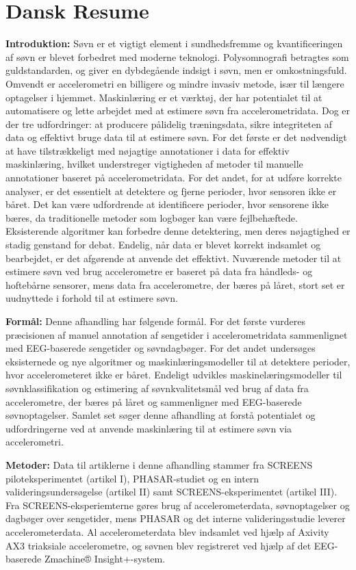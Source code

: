 \documentclass[
  10pt,
]{scrbook}
\begin{document}
\hypertarget{dansk-resume}{%
\chapter{Dansk Resume}\label{dansk-resume}}

\textbf{Introduktion:} Søvn er et vigtigt element i sundhedsfremme og
kvantificeringen af søvn er blevet forbedret med moderne teknologi.
Polysomnografi betragtes som guldstandarden, og giver en dybdegående
indsigt i søvn, men er omkostningsfuld. Omvendt er accelerometri en
billigere og mindre invasiv metode, især til længere optagelser i
hjemmet. Maskinlæring er et værktøj, der har potentialet til at
automatisere og lette arbejdet med at estimere søvn fra
accelerometridata. Dog er der tre udfordringer: at producere pålidelig
træningsdata, sikre integriteten af data og effektivt bruge data til at
estimere søvn. For det første er det nødvendigt at have tilstrækkeligt
med nøjagtige annotationer i data for effektiv maskinlæring, hvilket
understreger vigtigheden af metoder til manuelle annotationer baseret på
accelerometridata. For det andet, for at udføre korrekte analyser, er
det essentielt at detektere og fjerne perioder, hvor sensoren ikke er
båret. Det kan være udfordrende at identificere perioder, hvor sensorene
ikke bæres, da traditionelle metoder som logbøger kan være
fejlbehæftede. Eksisterende algoritmer kan forbedre denne detektering,
men deres nøjagtighed er stadig genstand for debat. Endelig, når data er
blevet korrekt indsamlet og bearbejdet, er det afgørende at anvende det
effektivt. Nuværende metoder til at estimere søvn ved brug accelerometre
er baseret på data fra håndleds- og hoftebårne sensorer, mens data fra
accelerometre, der bæres på låret, stort set er uudnyttede i forhold til
at estimere søvn.

\textbf{Formål:} Denne afhandling har følgende formål. For det første
vurderes præcisionen af manuel annotation af sengetider i
accelerometridata sammenlignet med EEG-baserede sengetider og
søvndagbøger. For det andet undersøges eksisternede og nye algoritmer og
maskinlæringsmodeller til at detektere perioder, hvor accelerometeret
ikke er båret. Endeligt udvikles maskinelæringsmodeller til
søvnklassifikation og estimering af søvnkvalitetsmål ved brug af data
fra accelerometre, der bæres på låret og sammenligner med EEG-baserede
søvnoptagelser. Samlet set søger denne afhandling at forstå potentialet
og udfordringerne ved at anvende maskinlæring til at estimere søvn via
accelerometri.

\textbf{Metoder:} Data til artiklerne i denne afhandling stammer fra
SCREENS piloteksperimentet (artikel I), PHASAR-studiet og en intern
valideringsundersøgelse (artikel II) samt SCREENS-eksperimentet (artikel
III). Fra SCREENS-eksperiemterne gøres brug af accelerometerdata,
søvnoptagelser og dagbøger over sengetider, mens PHASAR og det interne
valideringsstudie leverer accelerometerdata. Al accelerometerdata blev
indsamlet ved hjælp af Axivity AX3 triaksiale accelerometre, og søvnen
blev registreret ved hjælp af det EEG-baserede Zmachine®
Insight+-system.
\end{document}
